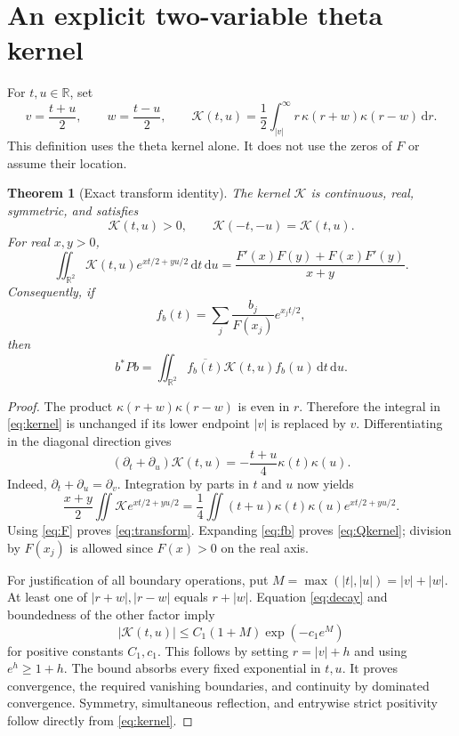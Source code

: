 \documentclass[11pt,letterpaper]{article}
\newtheorem{theorem}{Theorem}[section]
\theoremstyle{remark}\newtheorem{remark}[theorem]{Remark}
\newcommand{\R}{\mathbb R}\newcommand{\C}{\mathbb C}
\newcommand{\K}{\mathcal K}\newcommand{\dd}{\,\mathrm d}
\numberwithin{equation}{section}
\begin{document}
\section{An explicit two-variable theta kernel}

For $t,u\in\R$, set
\begin{equation}\label{eq:kernel}
v=\frac{t+u}{2},\qquad w=\frac{t-u}{2},\qquad
\boxed{\K(t,u)=\frac12\int_{|v|}^{\infty}r\,\kappa(r+w)\kappa(r-w)\dd r.}
\end{equation}
This definition uses the theta kernel alone. It does not use the zeros of $F$ or assume their location.

\begin{theorem}[Exact transform identity]\label{thm:identity}
The kernel $\K$ is continuous, real, symmetric, and satisfies
\begin{equation}
\K(t,u)>0,\qquad \K(-t,-u)=\K(t,u).
\end{equation}
For real $x,y>0$,
\begin{equation}\label{eq:transform}
\boxed{
\iint_{\R^2}\K(t,u)e^{xt/2+yu/2}\dd t\dd u
=\frac{F'(x)F(y)+F(x)F'(y)}{x+y}.}
\end{equation}
Consequently, if
\begin{equation}\label{eq:fb}
f_b(t)=\sum_j\frac{b_j}{F(x_j)}e^{x_jt/2},
\end{equation}
then
\begin{equation}\label{eq:Qkernel}
b^*Pb=\iint_{\R^2}\overline{f_b(t)}\K(t,u)f_b(u)\dd t\dd u.
\end{equation}
\end{theorem}
\begin{proof}
The product $\kappa(r+w)\kappa(r-w)$ is even in $r$. Therefore the integral in \eqref{eq:kernel} is unchanged if its lower endpoint $|v|$ is replaced by $v$. Differentiating in the diagonal direction gives
\begin{equation}\label{eq:transport}
(\partial_t+\partial_u)\K(t,u)
=-\frac{t+u}{4}\kappa(t)\kappa(u).
\end{equation}
Indeed, $\partial_t+\partial_u=\partial_v$. Integration by parts in $t$ and $u$ now yields
\[
\frac{x+y}{2}\iint\K e^{xt/2+yu/2}
=\frac14\iint(t+u)\kappa(t)\kappa(u)e^{xt/2+yu/2}.
\]
Using \eqref{eq:F} proves \eqref{eq:transform}. Expanding \eqref{eq:fb} proves \eqref{eq:Qkernel}; division by $F(x_j)$ is allowed since $F(x)>0$ on the real axis.

For justification of all boundary operations, put $M=\max(|t|,|u|)=|v|+|w|$. At least one of $|r+w|,|r-w|$ equals $r+|w|$. Equation \eqref{eq:decay} and boundedness of the other factor imply
\[
|\K(t,u)|\le C_1(1+M)\exp(-c_1e^M)
\]
for positive constants $C_1,c_1$. This follows by setting $r=|v|+h$ and using $e^h\ge1+h$. The bound absorbs every fixed exponential in $t,u$. It proves convergence, the required vanishing boundaries, and continuity by dominated convergence. Symmetry, simultaneous reflection, and entrywise strict positivity follow directly from \eqref{eq:kernel}.
\end{proof}
\end{document}
